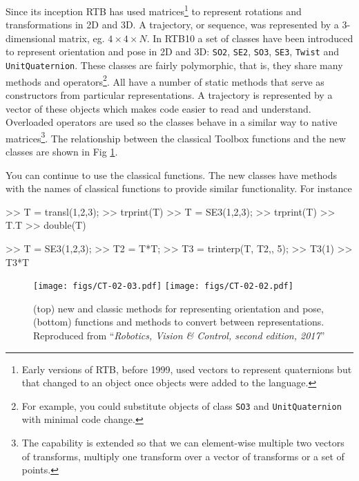 \documentclass[a4paper,twoside]{report}
\begin{document}
Since its inception RTB has used matrices\footnote{Early versions of RTB, before 1999, used vectors to represent quaternions but that changed to an object once objects were added to the language.} to represent rotations and transformations in 2D and 3D.  A trajectory, or sequence, was represented by a 3-dimensional matrix, eg. $4\times 4 \times N$.  In RTB10 a set of classes have been introduced to represent orientation and pose in 2D and 3D: \texttt{SO2}, \texttt{SE2}, \texttt{SO3}, \texttt{SE3}, \texttt{Twist} and \texttt{UnitQuaternion}.  These classes are fairly polymorphic, that is, they share many methods and operators\footnote{For example, you could substitute objects of class \texttt{SO3} and \texttt{UnitQuaternion} with minimal code change.}.  All have a number of static methods that serve as constructors from particular representations.  A trajectory is represented by a vector of these objects which makes code easier to read and
understand.  Overloaded operators are used so the classes behave in a similar way to native matrices\footnote{The capability is extended so that we can element-wise multiple two vectors of transforms, multiply one transform over a vector of transforms or a set of points.}.
The relationship between the classical Toolbox functions and the new classes are shown in Fig \ref{fig:newfunctions}.

You can continue to use the classical functions.  The new classes have methods with the names of classical functions to provide similar functionality.  For instance
\begin{Code}
>> T = transl(1,2,3);  %
>> trprint(T)  %
>> T = SE3(1,2,3);  %
>> trprint(T)  %
>> T.T   %
>> double(T) %
\end{Code}

\begin{Code}
>> T = SE3(1,2,3);  %
>> T2 = T*T;  %
>> T3 = trinterp(T, T2,, 5); %
>> T3(1)  %
>> T3*T  %
\end{Code}

\begin{figure}[p]
\centering
\texttt{[image: figs/CT-02-03.pdf]}
\texttt{[image: figs/CT-02-02.pdf]}
\caption{(top) new and classic methods for representing orientation and pose, (bottom) functions and methods to convert
between representations.  Reproduced from ``\textit{Robotics, Vision \& Control, second edition, 2017}''}\label{fig:newfunctions}
\end{figure}
\end{document}
